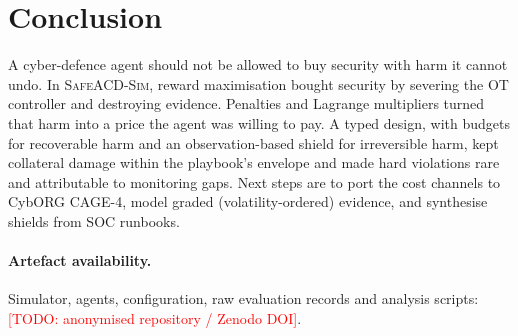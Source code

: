 \documentclass[10pt]{article}
\newcommand{\safeacd}{\textsc{SafeACD-Sim}}
\newcommand{\todo}[1]{\textcolor{red}{[TODO: #1]}}
\begin{document}
\section{Conclusion}
A cyber-defence agent should not be allowed to buy security with harm it
cannot undo. In \safeacd{}, reward maximisation bought security by severing
the OT controller and destroying evidence. Penalties and Lagrange multipliers
turned that harm into a price the agent was willing to pay. A typed design,
with budgets for recoverable harm and an observation-based shield for
irreversible harm, kept collateral damage within the playbook's envelope and
made hard violations rare and attributable to monitoring gaps. Next steps
are to port the cost channels to CybORG CAGE-4, model graded (volatility-ordered)
evidence, and synthesise shields from SOC runbooks.

\paragraph{Artefact availability.} Simulator, agents, configuration, raw
evaluation records and analysis scripts: \todo{anonymised repository / Zenodo DOI}.



\end{document}
